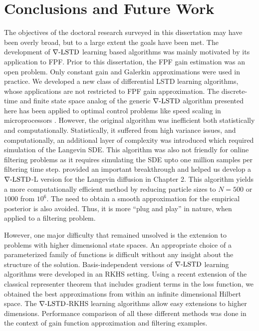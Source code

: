 \chapter{Conclusions and Future Work}
\label{ch:conclusions}
The objectives of the doctoral research surveyed in this dissertation may have been overly broad,  but to a large extent the goals have been met. The development of $\nabla\text{-LSTD}$ learning based algorithms was mainly motivated by its application to FPF. Prior to this dissertation, the FPF gain estimation was an open problem. Only constant gain and Galerkin approximations were used in practice. We developed a new class of differential LSTD learning algorithms, whose applications are not restricted to FPF gain approximation. The discrete-time and finite state space analog of the generic $\nabla\text{-LSTD}$ algorithm presented here has been applied to optimal control problems like speed scaling in microprocessors \cite{ctcn,devmey16a}. However, the original algorithm was inefficient both statistically and computationally. Statistically, it suffered from high variance issues, and computationally, an additional layer of complexity was introduced which required simulation of the Langevin SDE. This algorithm was also not friendly for online filtering problems as it requires simulating the SDE upto one million samples per filtering time step.  provided an important breakthrough and helped us develop a $\nabla\text{-LSTD}$-L version for the Langevin diffusion in Chapter 2. This algorithm yields a more computationally efficient method by reducing particle sizes to $N=500$ or $1000$ from $10^6$. The need to obtain a smooth approximation for the empirical posterior is also avoided. Thus, it is more ``plug and play'' in nature, when applied to a filtering problem.  

However, one major difficulty that remained unsolved is the extension to problems with higher dimensional state spaces. An appropriate choice of a parameterized family of functions is difficult without any insight about the structure of the solution. Basis-independent versions of $\nabla\text{-LSTD}$ learning algorithms were developed in an RKHS setting. Using a recent extension of the classical representer theorem that includes gradient terms in the loss function, we obtained the best approximations from within an infinite dimensional Hilbert space. The $\nabla\text{-LSTD}$-RKHS learning algorithms allow easy extensions to higher dimensions. Performance comparison of all these different methods was done in the context of gain function approximation and filtering examples. 

